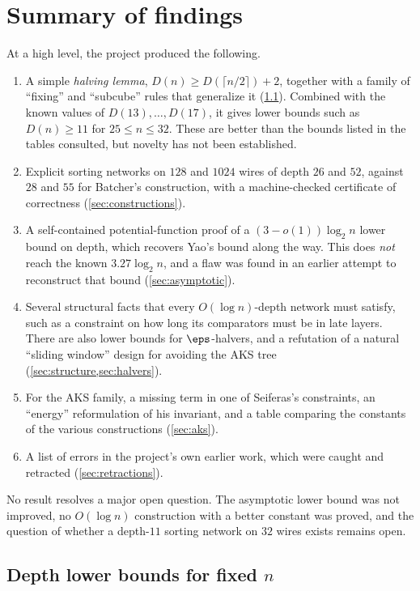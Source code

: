 \section{Summary of findings}

At a high level, the project produced the following.
\begin{enumerate}
    \item A simple \emph{halving lemma}, $D(n) \ge D(\lceil n/2 \rceil) + 2$, together with a family of ``fixing'' and ``subcube'' rules that generalize it (\cref{sec:fixed-lower}). Combined with the known values of $D(13), \dots, D(17)$, it gives lower bounds such as $D(n) \ge 11$ for $25 \le n \le 32$. These are better than the bounds listed in the tables consulted, but novelty has not been established.
    \item Explicit sorting networks on $128$ and $1024$ wires of depth $26$ and $52$, against $28$ and $55$ for Batcher's construction, with a machine-checked certificate of correctness (\cref{sec:constructions}).
    \item A self-contained potential-function proof of a $(3 - o(1))\log_2 n$ lower bound on depth, which recovers Yao's bound along the way. This does \emph{not} reach the known $3.27\log_2 n$, and a flaw was found in an earlier attempt to reconstruct that bound (\cref{sec:asymptotic}).
    \item Several structural facts that every $O(\log n)$-depth network must satisfy, such as a constraint on how long its comparators must be in late layers. There are also lower bounds for $\eps$-halvers, and a refutation of a natural ``sliding window'' design for avoiding the AKS tree (\cref{sec:structure,sec:halvers}).
    \item For the AKS family, a missing term in one of Seiferas's constraints, an ``energy'' reformulation of his invariant, and a table comparing the constants of the various constructions (\cref{sec:aks}).
    \item A list of errors in the project's own earlier work, which were caught and retracted (\cref{sec:retractions}).
\end{enumerate}
No result resolves a major open question. The asymptotic lower bound was not improved, no $O(\log n)$ construction with a better constant was proved, and the question of whether a depth-$11$ sorting network on $32$ wires exists remains open.

\subsection{Depth lower bounds for fixed \texorpdfstring{$n$}{n}}\label{sec:fixed-lower}

